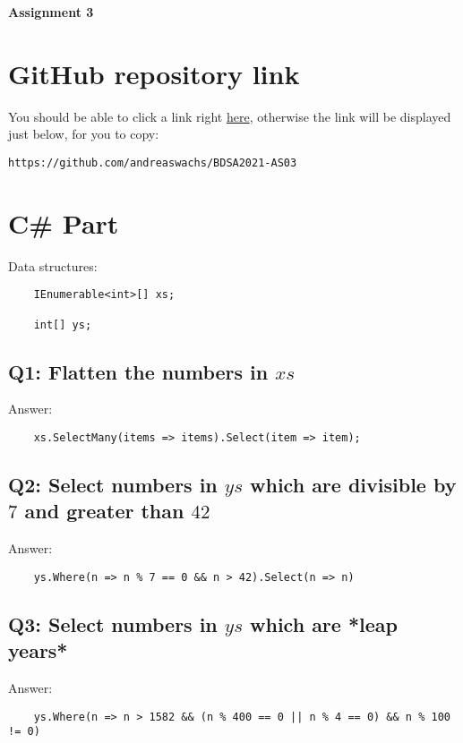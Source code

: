 \documentclass[12pt,letterpaper]{article}
\newcommand\hwnumber{3}                 %
\begin{document}
\begin{center}
    \textbf{\Large Assignment \hwnumber}
\end{center}

\section{GitHub repository link}

You should be able to click a link right \href{https://github.com/andreaswachs/BDSA2021-AS03}{here}, 
otherwise the link will be displayed just below, for you to copy:

\lstinline{https://github.com/andreaswachs/BDSA2021-AS03}

\section{C\# Part}

Data structures:

\begin{lstlisting}
    IEnumerable<int>[] xs;

    int[] ys;
\end{lstlisting}

\subsection{Q1: Flatten the numbers in $xs$}

Answer:

\begin{lstlisting}
    xs.SelectMany(items => items).Select(item => item);
\end{lstlisting}


\subsection{Q2: Select numbers in $ys$ which are divisible by $7$ and greater than $42$} 

Answer:

\begin{lstlisting}
    ys.Where(n => n % 7 == 0 && n > 42).Select(n => n)
\end{lstlisting}

\subsection{Q3: Select numbers in $ys$ which are *leap years*}

Answer:

\begin{lstlisting}
    ys.Where(n => n > 1582 && (n % 400 == 0 || n % 4 == 0) && n % 100 != 0)
\end{lstlisting}
\end{document}
